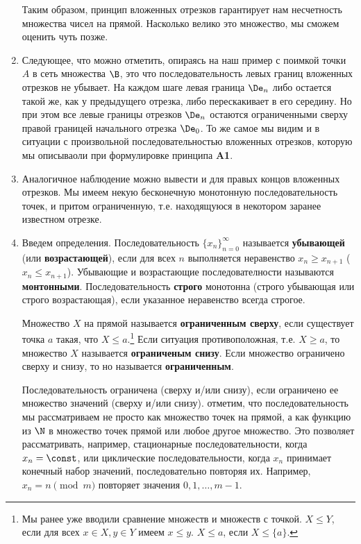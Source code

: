 \begin{enumerate}
Таким образом, принцип вложенных отрезков гарантирует нам несчетность множества чисел на прямой. Насколько велико это множество, мы сможем оценить чуть позже.




\item Следующее, что можно отметить, опираясь на наш пример с поимкой точки $A$ в сеть множества $\B$, это что последовательность левых границ вложенных отрезков не убывает. На каждом шаге левая граница $\De_n$ либо остается такой же, как у предыдущего отрезка, либо перескакивает в его середину. Но при этом все левые границы отрезков $\De_n$ остаются ограниченными сверху правой границей начального отрезка $\De_0$. То же самое мы видим и в ситуации с произвольной последовательностью вложенных отрезков, которую мы описываоли при формулировке принципа \textbf{A1}.
\item Аналогичное наблюдение можно вывести и для правых концов вложенных отрезков. Мы имеем некую бесконечную монотонную последовательность точек, и притом ограниченную, т.е. находящуюся в некотором заранее известном отрезке.
\item Введем определения. Последовательность $\{x_n\}_{n=0}^\infty$ называется \textbf{убывающей} (или \textbf{возрастающей}), если для всех $n$ выполняется неравенство $x_n\ge x_{n+1}$ ($x_n\le x_{n+1}$). Убывающие и возрастающие последователности называются \textbf{монтонными}. Последовательность \textbf{строго} монотонна (строго убывающая или строго возрастающая), если указанное неравенство всегда строгое.

Множество $X$ на прямой называется \textbf{ограниченным сверху}, если существует точка $a$ такая, что $X\le a$.\footnote{Мы ранее уже вводили сравнение множеств и множеств с точкой. $X\le Y$, если для всех $x\in X,y\in Y$ имеем $x\le y$. $X\le a$, если $X\le\{a\}$. } Если ситуация противоположная, т.е. $X\ge a$, то множество $X$ называется \textbf{ограниченым снизу}. Если множество ограничено сверху и снизу, то но называется \textbf{ограниченным}.

Последовательность ограничена (сверху и/или снизу), если ограничено ее множество значений (сверху и/или снизу). отметим, что последовательность мы рассматриваем не просто как множество точек на прямой, а как функцию из $\N$ в множество точек прямой или любое другое множество. Это позволяет рассматривать, например, стационарные последовательности, когда $x_n=\const$, или циклические последовательности, когда $x_n$ принимает конечный набор значений, последовательно повторяя их. Например, $x_n=n\pmod m$ повторяет значения $0,1,\dots,m-1$.


\end{enumerate}
